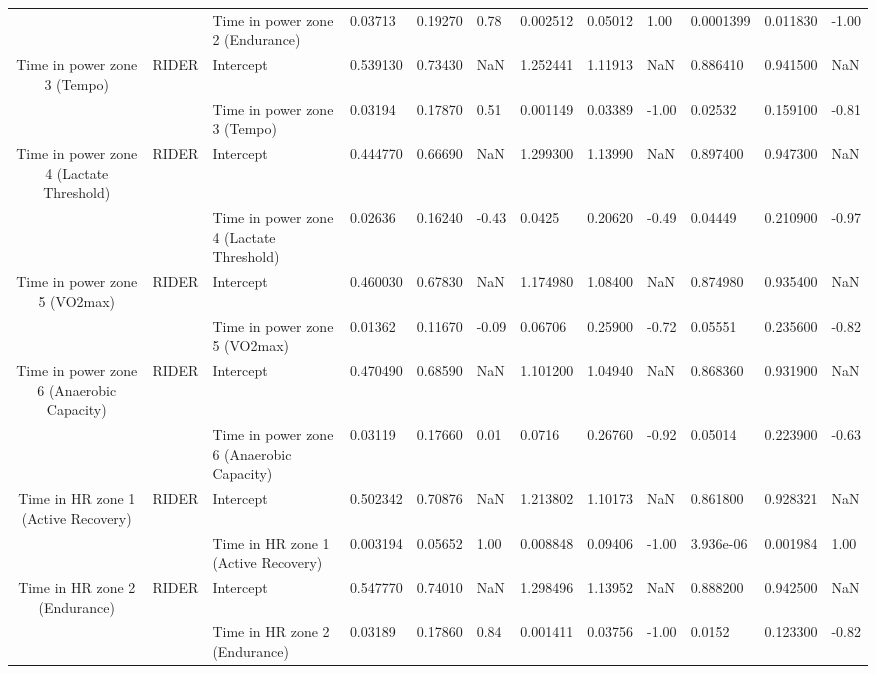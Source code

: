 \begin{tabular}{c}
                                      &       & Time in power zone 2 (Endurance) &   0.03713 &  0.19270 &  0.78 &  0.002512 &  0.05012 &  1.00 &  0.0001399 &  0.011830 & -1.00 \\
Time in power zone 3 (Tempo) & RIDER & Intercept &  0.539130 &  0.73430 &   NaN &  1.252441 &  1.11913 &   NaN &   0.886410 &  0.941500 &   NaN \\
                                      &       & Time in power zone 3 (Tempo) &   0.03194 &  0.17870 &  0.51 &  0.001149 &  0.03389 & -1.00 &    0.02532 &  0.159100 & -0.81 \\
Time in power zone 4 (Lactate Threshold) & RIDER & Intercept &  0.444770 &  0.66690 &   NaN &  1.299300 &  1.13990 &   NaN &   0.897400 &  0.947300 &   NaN \\
                                      &       & Time in power zone 4 (Lactate Threshold) &   0.02636 &  0.16240 & -0.43 &    0.0425 &  0.20620 & -0.49 &    0.04449 &  0.210900 & -0.97 \\
Time in power zone 5 (VO2max) & RIDER & Intercept &  0.460030 &  0.67830 &   NaN &  1.174980 &  1.08400 &   NaN &   0.874980 &  0.935400 &   NaN \\
                                      &       & Time in power zone 5 (VO2max) &   0.01362 &  0.11670 & -0.09 &   0.06706 &  0.25900 & -0.72 &    0.05551 &  0.235600 & -0.82 \\
Time in power zone 6 (Anaerobic Capacity) & RIDER & Intercept &  0.470490 &  0.68590 &   NaN &  1.101200 &  1.04940 &   NaN &   0.868360 &  0.931900 &   NaN \\
                                      &       & Time in power zone 6 (Anaerobic Capacity) &   0.03119 &  0.17660 &  0.01 &    0.0716 &  0.26760 & -0.92 &    0.05014 &  0.223900 & -0.63 \\
Time in HR zone 1 (Active Recovery) & RIDER & Intercept &  0.502342 &  0.70876 &   NaN &  1.213802 &  1.10173 &   NaN &   0.861800 &  0.928321 &   NaN \\
                                      &       & Time in HR zone 1 (Active Recovery) &  0.003194 &  0.05652 &  1.00 &  0.008848 &  0.09406 & -1.00 &  3.936e-06 &  0.001984 &  1.00 \\
Time in HR zone 2 (Endurance) & RIDER & Intercept &  0.547770 &  0.74010 &   NaN &  1.298496 &  1.13952 &   NaN &   0.888200 &  0.942500 &   NaN \\
                                      &       & Time in HR zone 2 (Endurance) &   0.03189 &  0.17860 &  0.84 &  0.001411 &  0.03756 & -1.00 &     0.0152 &  0.123300 & -0.82 \\

\end{tabular}
